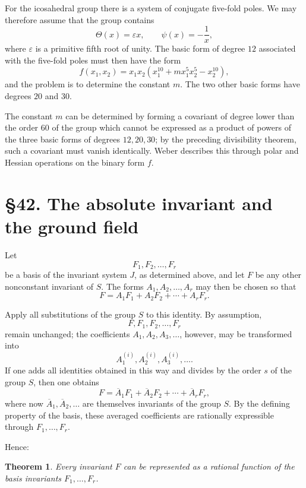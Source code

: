 \documentclass[11pt,a4paper]{book}
\newcommand{\webersection}[2]{\clearpage\section*{\S #1. #2}}
\newtheorem*{satz}{Theorem}
\begin{document}
For the icosahedral group there is a system of conjugate five-fold poles.  We may therefore assume that the group contains
\begin{equation}\label{eq:w9-ico-generators}
 \Theta(x)=\varepsilon x,
 \qquad
 \psi(x)=-\frac1x,
\end{equation}
where $\varepsilon$ is a primitive fifth root of unity.  The basic form of degree $12$ associated with the five-fold poles must then have the form
\begin{equation}\label{eq:w9-ico-f}
 f(x_1,x_2)=x_1x_2(x_1^{10}+m x_1^5x_2^5-x_2^{10}),
\end{equation}
and the problem is to determine the constant $m$.  The two other basic forms have degrees $20$ and $30$.

The constant $m$ can be determined by forming a covariant of degree lower than the order $60$ of the group which cannot be expressed as a product of powers of the three basic forms of degrees $12,20,30$; by the preceding divisibility theorem, such a covariant must vanish identically.  Weber describes this through polar and Hessian operations on the binary form $f$.

\webersection{42}{The absolute invariant and the ground field}

Let
\[
F_1,F_2,\ldots,F_r
\]
be a basis of the invariant system \(J\), as determined above, and let \(F\) be any other nonconstant invariant of \(S\).  The forms \(A_1,A_2,\ldots,A_r\) may then be chosen so that
\begin{equation}
F=A_1F_1+A_2F_2+\cdots+A_rF_r.
\end{equation}

Apply all substitutions of the group \(S\) to this identity.  By assumption,
\[
F,F_1,F_2,\ldots,F_r
\]
remain unchanged; the coefficients \(A_1,A_2,A_3,\ldots\), however, may be transformed into
\[
A_1^{(i)},A_2^{(i)},A_3^{(i)},\ldots .
\]
If one adds all identities obtained in this way and divides by the order \(s\) of the group \(S\), then one obtains
\begin{equation}
F=\overline A_1F_1+\overline A_2F_2+\cdots+\overline A_rF_r,
\end{equation}
where now \(\overline A_1,\overline A_2,\ldots\) are themselves invariants of the group \(S\).  By the defining property of the basis, these averaged coefficients are rationally expressible through \(F_1,\ldots,F_r\).

Hence:

\begin{satz}
Every invariant \(F\) can be represented as a rational function of the basis invariants \(F_1,\ldots,F_r\).
\end{satz}
\end{document}
